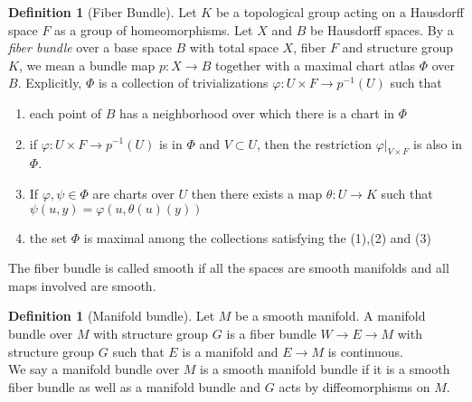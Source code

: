 \documentclass[reqno]{amsart}
\theoremstyle{definition}
\newtheorem{definition}[theorem]{Definition}
\theoremstyle{remark}
\begin{document}
\begin{definition}[Fiber Bundle]
    Let $K$ be a topological group acting on a
    Hausdorff space $F$ as a group of homeomorphisms.
    Let $X$ and $B$ be Hausdorff spaces. By a 
    \textit{fiber bundle} over a base space
    $B$ with total space $X$, fiber $F$ and structure
    group $K$, we mean a bundle map
    $p \colon X \to B$ together with a maximal
    chart atlas
    $\Phi$ over $B$. Explicitly, $\Phi$ is a collection
    of trivializations
    $\varphi  \colon U
    \times F \to p^{-1}(U)$ such that
    \begin{enumerate}
        \item each point of $B$ has a neighborhood
            over which there is a chart in
            $\Phi$
        \item if $ \varphi \colon U \times F
            \to p^{-1} (U) $ is in
            $\Phi$ and  $V \subset U$, then the
            restriction
            $\varphi |_{V \times F}$ is also in
            $\Phi$.
        \item If $\varphi , \psi  \in \Phi$ are
            charts over $U$ then there exists a map
            $\theta \colon U \to K$ such that
            $\psi \left( u, y \right) 
            = \varphi \left( u, \theta(u) (y) \right) $ 
        \item the set $\Phi$ is maximal among the collections
            satisfying the (1),(2) and (3)
    \end{enumerate}
    The fiber bundle is called smooth if all the spaces
    are smooth manifolds and all maps involved are smooth.
\end{definition}

\begin{definition}[Manifold bundle]
    Let $M$ be a smooth manifold. A
    manifold bundle over $M$ with structure group
    $G$ is a fiber
    bundle
    $W \to E \to M$ with
    structure group $G$ such that
    $E$ is a manifold and $E \to M$ is continuous.\\
    We say a manifold bundle over $M$ is a smooth
    manifold bundle if it is 
    a smooth fiber bundle as well as
    a manifold bundle and $G$ acts by diffeomorphisms
    on $M$.
\end{definition}
\end{document}
